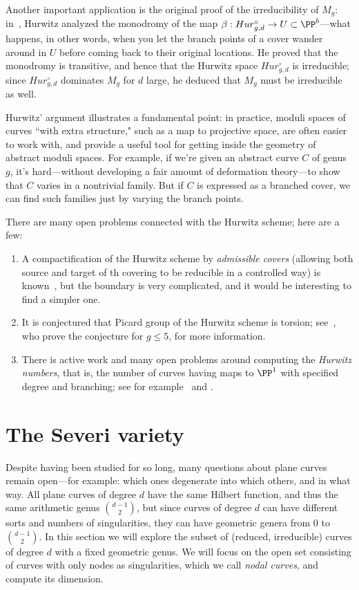 Another important application is the original proof of the irreducibility of $M_g$: in~\cite{Hurwitz}, Hurwitz analyzed the monodromy of the map $\beta: Hur^\circ_{g,d} \to U \subset \PP^b$---what happens, in other words, when you let the branch points of a cover wander around in $U$ before coming back to their original locations. He proved that the monodromy is transitive, and hence that the Hurwitz space $Hur^\circ_{g,d}$ is irreducible; since $Hur^\circ_{g,d}$ dominates $M_g$ for $d$ large, he deduced that $M_g$ must be irreducible as well.

Hurwitz' argument illustrates a fundamental point: in practice, moduli spaces of curves ``with extra structure," such as a map to projective space, are often easier to work with, and provide a useful tool for getting inside the geometry of abstract moduli spaces. For example, if we're given an abstract curve $C$ of genus $g$, it's hard---without developing a fair amount of deformation theory---to show that $C$ varies in a nontrivial family. But if $C$ is expressed as a branched cover, we can find such families just by varying the branch points.

There are many open problems connected with the Hurwitz scheme; here are a few:
\begin{enumerate}
 \item A compactification of the Hurwitz scheme by \emph{admissible covers} (allowing both source and target
of th covering to be reducible in a controlled way) is known~\cite{MR1631825}, but the boundary is very complicated, and it would be interesting to find a simpler one.

\item It is conjectured that  Picard group of the Hurwitz scheme is torsion; see~\cite{MR3320849}, who prove the conjecture for $g\leq 5$, for more information.

\item There is active work and many open problems around computing the \emph{Hurwitz numbers}, that is,
the number of curves having maps to $\PP^{1}$ with specified degree and branching; see for example~\cite{Hurwitz2} and \cite{ELSV}.
\end{enumerate}

\section{The Severi variety}\label{severi variety}

Despite having been studied for so long, many questions about plane curves remain open---for example: which ones degenerate into which others, and in what way. All plane curves of degree $d$ have the same Hilbert function, and thus the same arithmetic genus
$\binom{d-1}{2}$, but since curves of degree $d$ can have different sorts and numbers of singularities, they can have geometric genera from 0 to $\binom{d-1}{2}$. In this section we will explore the subset of (reduced, irreducible) curves of degree $d$ with a fixed geometric genus. We will focus on the open set consisting of curves with only nodes as singularities, which we call \emph{nodal curves}, and compute its dimension. 


